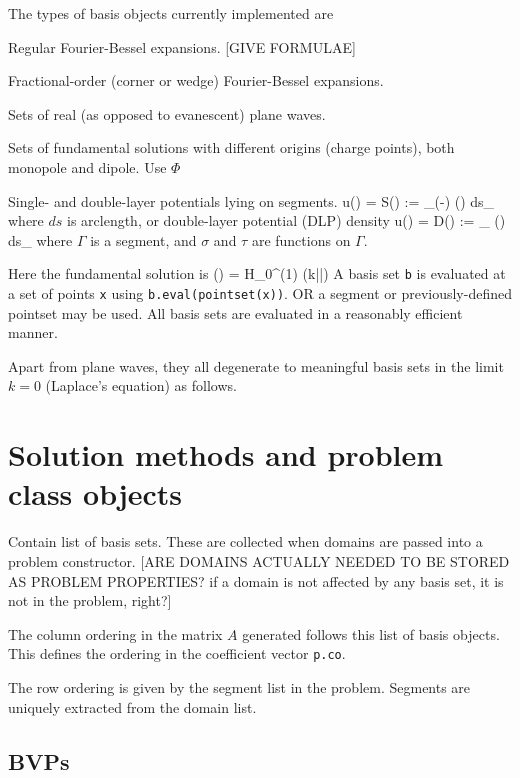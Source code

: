 \documentclass[12pt]{article}
\begin{document}
The types of basis objects currently implemented are
\bi
\item Regular Fourier-Bessel expansions.
[GIVE FORMULAE]
\item Fractional-order (corner or wedge) Fourier-Bessel expansions.
\item Sets of real (as opposed to evanescent) plane waves.
\item Sets of fundamental solutions with different origins (charge points),
both monopole and dipole.
Use $\Phi$
\item Single- and double-layer potentials lying on segments.
\be
u(\bx) = {\cal S}\sigma (\bx) := \int_\Gamma \Phi(\bx-\by) \sigma(\by) ds_\by
\ee
where $ds$ is arclength, or double-layer potential (DLP) density
\be
u(\bx) = {\cal D}\tau (\bx)
:= \int_\Gamma {} \tau(\by) ds_\by
\ee
where $\Gamma$ is a segment, and $\sigma$ and $\tau$ are functions on $\Gamma$.

\ei
Here the fundamental solution is
\be
        \Phi(\bx) = H_0^{(1)} (k|\bx|)
\label{e:fund}
\ee
A basis set {\tt b} is evaluated at a set of points {\tt x}
using {\tt b.eval(pointset(x))}.
OR a segment or previously-defined pointset may be used.
All basis sets are evaluated in a reasonably efficient manner.

Apart from plane waves, they all degenerate to meaningful basis sets
in the limit $k=0$ (Laplace's equation)
as follows.



\section{Solution methods and problem class objects}

Contain list of basis sets.
These are collected when domains are passed into a problem
constructor.
[ARE DOMAINS ACTUALLY NEEDED TO BE STORED AS PROBLEM PROPERTIES?
if a domain is not affected by any basis set, it is not in the problem, right?]

The column ordering in the matrix $A$ generated follows this list
of basis objects.
This defines the ordering in the coefficient vector {\tt p.co}.

The row ordering is given by the segment list in the problem.
Segments are uniquely extracted from the domain list.

\subsection{BVPs}
\end{document}
